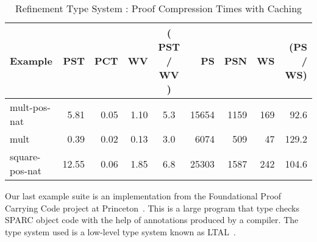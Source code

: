 \documentclass{llncs}
\begin{document}
\begin{table*}[htbp]
\begin{center}
\begin{small}
\begin{tabular}{|l|r|r|r|c|r|r|r|r|}
\hline
Example & PST 
& PCT & WV & ( PST / WV ) & PS & PSN & WS & (PS / WS)\\
\hline
mult-pos-nat & 5.81 & 0.05 & 1.10 & 5.3
& 15654 & 1159 & 169 & 92.6\\
mult & 0.39 & 0.02 & 0.13 & 3.0
& 6074 & 509 & 47 & 129.2\\
square-pos-nat & 12.55 & 0.06 & 1.85 & 6.8 
& 25303 & 1587 & 242 & 104.6\\
\hline
\end{tabular}
\end{small}
\end{center}
\caption{\label{tab:reftimes} Refinement Type System : 
Proof Compression Times with Caching}
\end{table*}

Our last example suite is an implementation from the Foundational 
Proof Carrying Code project at Princeton~\cite{Appel01lics}. This 
is a large program that type checks SPARC object code with the help 
of annotations produced by a compiler. The type system used is a
low-level type system known as LTAL~\cite{chen+:fpcc-ltal}.
\end{document}
